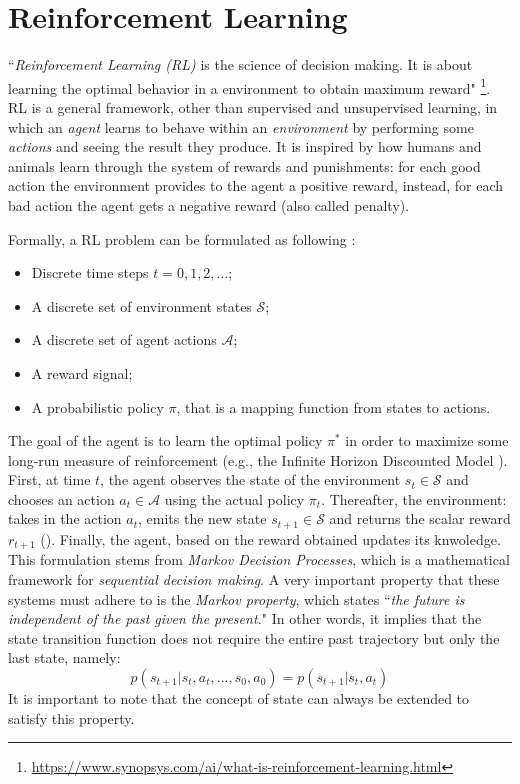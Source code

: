 \documentclass[12pt,a4paper,openright,twoside]{book}
\begin{document}
%
\section{Reinforcement Learning}
%

``\emph{Reinforcement Learning (RL)} is the science of decision making. It is about learning the optimal behavior 
    in a environment to obtain maximum reward" 
    \footnote{\url{https://www.synopsys.com/ai/what-is-reinforcement-learning.html}}.
    RL is a general framework, other than supervised and unsupervised learning, in which an \emph{agent} learns 
    to behave within an \emph{environment} by performing some \emph{actions} and seeing the result they produce.
    It is inspired by how humans and animals learn through the system of rewards and punishments: for each good action
    the environment provides to the agent a positive reward, instead, for each bad action the agent gets a negative 
    reward (also called penalty).

Formally, a RL problem can be formulated as following \cite{RLSurvey}:
    \begin{itemize}
        \item Discrete time steps $t=0, 1, 2, ...$;
        \item A discrete set of environment states $\mathcal{S}$;
        \item A discrete set of agent actions $\mathcal{A}$;
        \item A reward signal;
        \item A probabilistic policy $\pi$, that is a mapping function from states to actions.
    \end{itemize}
    The goal of the agent is to learn the optimal policy $\pi^*$ in order to maximize 
        some long-run measure of reinforcement (e.g., the Infinite Horizon Discounted Model \cite{RLSurvey}).
        First, at time $t$, the agent observes the state of the environment $s_t \in \mathcal{S}$
        and chooses an action $a_t \in \mathcal{A}$ using the actual policy $\pi_t$. 
        Thereafter, the environment: takes in the action $a_t$, emits the new state $s_{t+1} \in \mathcal{S}$ 
        and returns the scalar reward $r_{t+1}$ ().
        Finally, the agent, based on the reward obtained updates its knwoledge.
    This formulation stems from \emph{Markov Decision Processes}, which is a mathematical framework for \emph{sequential decision making}. A very important property that these systems must adhere to is the \emph{Markov property}, which states ``\emph{the future is independent of the past given the present.}" In other words, it implies that the state transition function does not require the entire past trajectory but only the last state, namely: 
    $$p(s_{t+1} | s_t, a_t, ..., s_0, a_0) = p(s_{t+1} | s_t, a_t)$$
    It is important to note that the concept of state can always be extended to satisfy this property.
\end{document}
